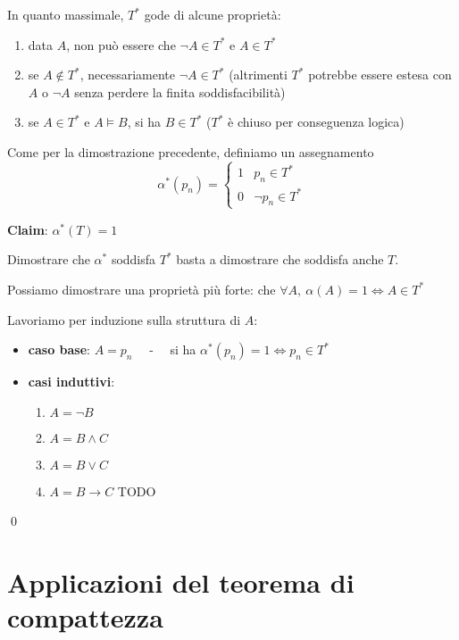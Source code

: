 \documentclass[a4paper,11pt]{report}
\begin{document}
In quanto massimale, \( T^* \) gode di alcune proprietà:
\begin{enumerate}
    \item data \( A \), non può essere che \( \neg A \in T^* \) e \( A \in T^* \)
    \item se \( A \not\in T^*\), necessariamente \( \neg A \in T^* \) {\color{gray}(altrimenti \( T^* \) potrebbe essere estesa con \( A \) o \( \neg A \) senza perdere la finita soddisfacibilità)}
    \item se \( A \in T^* \) e \( A \vDash B \), si ha \( B \in T^* \) (\( T^* \) è chiuso per conseguenza logica)
\end{enumerate}

Come per la dimostrazione precedente, definiamo un assegnamento
\[ \alpha^*(p_n) = \begin{cases}
    1 & p_n \in T^* \\
    0 & \neg p_n \in T^*
\end{cases}  \]

\textbf{Claim}: \( \alpha^*(T)=1 \)

Dimostrare che \( \alpha^* \) soddisfa \( T^* \) basta a dimostrare che soddisfa anche \( T \). 

Possiamo dimostrare una proprietà più forte: che \( \forall A, \ \alpha(A)=1 \iff A \in T^* \)

Lavoriamo per induzione sulla struttura di \( A \):
\begin{itemize}
    \item \textbf{caso base}: \( A = p_n \) \ \ - \ \ si ha \( \alpha^*(p_n) = 1 \iff p_n \in T^* \)
    \item \textbf{casi induttivi}:
        \begin{enumerate}
            \item \( A = \neg B \)
                \subitem 
            \item \( A = B \land C \)
                \subitem
            \item \( A = B \lor C \)
                \subitem
            \item \( A = B \to C\)
                \subitem TODO
        \end{enumerate}
\end{itemize}
\qed

\section{Applicazioni del teorema di compattezza}
\end{document}
